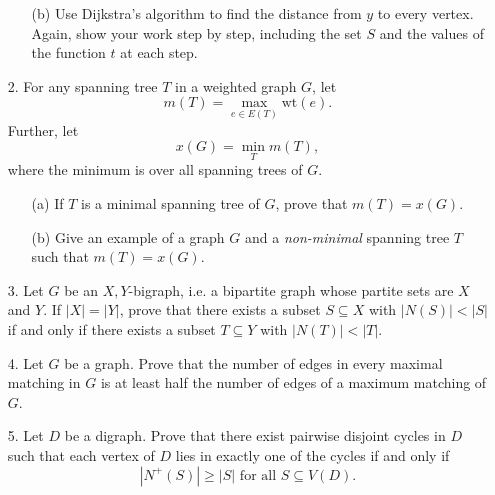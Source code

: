 \documentclass[12pt]{article}
\newcommand{\wt}[1]{\text{wt}({#1})}
\begin{document}
\begin{enumerate}
\begin{enumerate}
    \item[(b)] Use Dijkstra's algorithm to find the distance from $y$ to every vertex. Again, show your work step by step, including the set $S$ and the values of the function $t$ at each step.
    
\end{enumerate}

\item[2.] For any spanning tree $T$ in a weighted graph $G$, let \[m(T) = \max_{e\in E(T)} \wt{e}.\] Further, let \[x(G) = \min_T m(T),\] where the minimum is over all spanning trees of $G$.

\begin{enumerate}

\item[(a)] If $T$ is a minimal spanning tree of $G$, prove that $m(T) = x(G)$.

\item[(b)] Give an example of a graph $G$ and a \emph{non-minimal} spanning tree $T$ such that $m(T)= x(G)$.

\end{enumerate}

\item[3.] Let $G$ be an $X,Y$-bigraph, i.e. a bipartite graph whose partite sets are $X$ and $Y$. If $|X|=|Y|$, prove that there exists a subset $S\subseteq X$ with $|N(S)|<|S|$ if and only if there exists a subset $T\subseteq Y$ with $|N(T)|<|T|$.

\item[4.] Let $G$ be a graph. Prove that the number of edges in every maximal matching in $G$ is at least half the number of edges of a maximum matching of $G$.

\item[5.] Let $D$ be a digraph. Prove that there exist pairwise disjoint cycles in $D$ such that each vertex of $D$ lies in exactly one of the cycles if and only if \[|N^+(S)|\ge |S| \text{ for all } S\subseteq V(D).\]

\end{enumerate}
\end{document}
